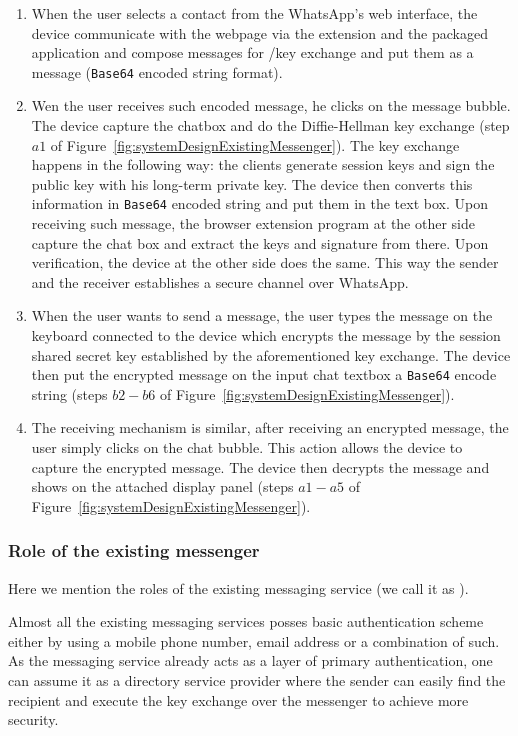 \begin{enumerate}
  \item When the user selects a contact from the WhatsApp's web interface, the \usb device communicate with the webpage via the extension and the packaged application and compose messages for \ssl/\tls key exchange and put them as a message (\texttt{Base64} encoded string format).
  \item Wen the user receives such encoded message, he clicks on the message bubble. The \usb device capture the chatbox and do the Diffie-Hellman key exchange (step $a1$ of Figure~\ref{fig:systemDesignExistingMessenger}). The key exchange happens in the following way: the clients generate session keys and sign the public key with his long-term private key. The \usb device then converts this information in \texttt{Base64} encoded string and put them in the text box. Upon receiving such message, the browser extension program at the other side capture the chat box and extract the keys and signature from there. Upon verification, the \usb device at the other side does the same. This way the sender and the receiver establishes a secure channel over WhatsApp.
  \item When the user wants to send a message, the user types the message on the keyboard connected to the \usb device which encrypts the message by the session shared secret key established by the aforementioned key exchange. The device then put the encrypted message on the input chat textbox a \texttt{Base64} encode string (steps $b2 - b6$ of Figure~\ref{fig:systemDesignExistingMessenger}).
  \item The receiving mechanism is similar, after receiving an encrypted message, the user simply clicks on the chat bubble. This action allows the \usb device to capture the encrypted message. The device then decrypts the message and shows on the attached display panel (steps $a1 - a5$ of Figure~\ref{fig:systemDesignExistingMessenger}).
\end{enumerate}


\subsubsection{Role of the existing messenger}
Here we mention the roles of the existing messaging service (we call it as \messenger).

 Almost all the existing messaging services posses basic authentication scheme either by using a mobile phone number, email address or a combination of such.  
 As the messaging service already acts as a layer of primary authentication, one can assume it as a directory service provider where the sender can easily find the recipient and execute the key exchange over the messenger to achieve more security.


